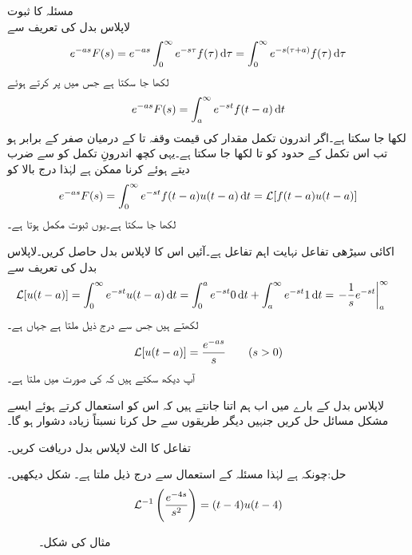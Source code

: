 \quad مسئلہ  کا ثبوت\\
لاپلاس بدل کی تعریف سے 
\begin{align*}
e^{-as}F(s)=e^{-as}\int_{0}^{\infty}e^{-s\tau}f(\tau)\dif \tau=\int_{0}^{\infty}e^{-s(\tau+a)}f(\tau)\dif \tau
\end{align*}
لکھا جا سکتا ہے جس میں  پر کرتے ہوئے
\begin{align*}
e^{-as}F(s)=\int_{a}^{\infty}e^{-st}f(t-a)\dif t
\end{align*}
لکھا جا سکتا ہے۔اگر اندرون تکمل مقدار کی قیمت وقفہ  تا  کے درمیان صفر کے برابر ہو تب  اس تکمل کے حدود  کو  تا  لکھا جا سکتا ہے۔یہی کچھ اندرونِ تکمل کو  سے ضرب دیتے ہوئے کرنا ممکن ہے لہٰذا درج بالا کو 
\begin{align*}
e^{-as}F(s)=\int_{0}^{\infty}e^{-st}f(t-a)u(t-a)\dif t=\Laplace[f(t-a)u(t-a)]
\end{align*}
لکھا جا سکتا ہے۔یوں ثبوت مکمل ہوتا ہے۔

اکائی سیڑھی تفاعل نہایت اہم تفاعل ہے۔آئیں اس کا لاپلاس بدل حاصل کریں۔لاپلاس بدل کی تعریف سے
\begin{align*}
\Laplace[u(t-a)]&=\int_{0}^{\infty} e^{-st}u(t-a)\dif t=\int_{0}^{a}e^{-st} 0 \dif t+\int_{a}^{\infty}e^{-st} 1\dif t=\left. -\frac{1}{s}e^{-st}\right|_{a}^{\infty}
\end{align*}
لکھتے ہیں جس سے درج ذیل ملتا ہے جہاں  ہے۔
\begin{align}
\mathcal{L}[u(t-a)]=\frac{e^{-as}}{s}\quad \quad (s>0)
\end{align}
آپ دیکھ سکتے ہیں کہ  کی صورت میں  ملتا ہے۔

لاپلاس بدل کے بارے میں اب ہم اتنا جانتے ہیں کہ اس کو استعمال کرتے ہوئے ایسے مشکل مسائل حل کریں جنہیں دیگر طریقوں سے حل کرنا نسبتاً زیادہ دشوار ہو گا۔

تفاعل  کا الٹ لاپلاس بدل دریافت کریں۔

حل:چونکہ  ہے لہٰذا مسئلہ  کے استعمال سے درج ذیل ملتا ہے۔ شکل  دیکھیں۔
\begin{align*}
\mathcal{L}^{-1}\left(\frac{e^{-4s}}{s^2}\right)=(t-4)u(t-4)
\end{align*}
%
\begin{figure}
\centering
{}
\caption{مثال  کی شکل۔}
\label{شکل_مثال_لاپلاس_منتقلی_وقتی_محور_الف}
\end{figure}
